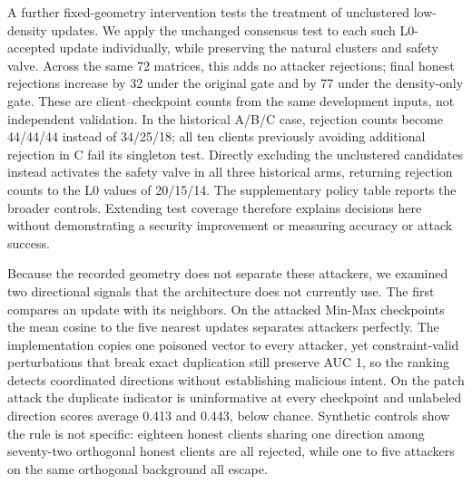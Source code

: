 \documentclass[journal]{IEEEtran}
\begin{document}
A further fixed-geometry intervention tests the treatment of unclustered low-density updates. We apply the unchanged consensus test to each such L0-accepted update individually, while preserving the natural clusters and safety valve. Across the same 72 matrices, this adds no attacker rejections; final honest rejections increase by 32 under the original gate and by 77 under the density-only gate. These are client--checkpoint counts from the same development inputs, not independent validation. In the historical A/B/C case, rejection counts become 44/44/44 instead of 34/25/18; all ten clients previously avoiding additional rejection in C fail its singleton test. Directly excluding the unclustered candidates instead activates the safety valve in all three historical arms, returning rejection counts to the L0 values of 20/15/14. The supplementary policy table reports the broader controls. Extending test coverage therefore explains decisions here without demonstrating a security improvement or measuring accuracy or attack success.

Because the recorded geometry does not separate these attackers, we examined two directional signals that the architecture does not currently use. The first compares an update with its neighbors. On the attacked Min-Max checkpoints the mean cosine to the five nearest updates separates attackers perfectly. The implementation copies one poisoned vector to every attacker, yet constraint-valid perturbations that break exact duplication still preserve AUC 1, so the ranking detects coordinated directions without establishing malicious intent. On the patch attack the duplicate indicator is uninformative at every checkpoint and unlabeled direction scores average 0.413 and 0.443, below chance. Synthetic controls show the rule is not specific: eighteen honest clients sharing one direction among seventy-two orthogonal honest clients are all rejected, while one to five attackers on the same orthogonal background all escape.
\end{document}
